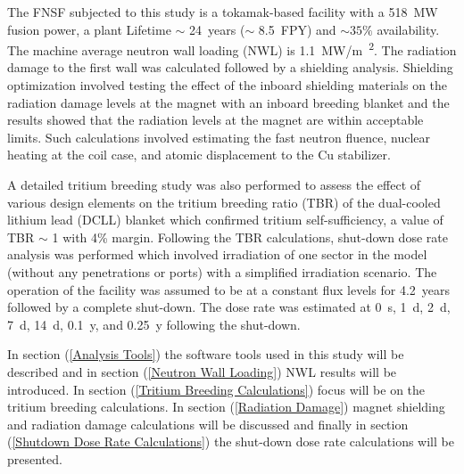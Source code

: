 \documentclass[12pt, letterpaper]{elsarticle}
\begin{document}
The FNSF subjected to this study is a tokamak-based facility with a \SI{518}{MW} fusion power, a plant Lifetime $\sim$ \SI{24}{years} ($\sim$ \SI{8.5}{FPY}) and $\sim 35\%$ availability. The machine average neutron wall loading (NWL) is \SI{1.1}{MW/m\textsuperscript{2}}. The radiation damage to the first wall was calculated followed by a shielding analysis. Shielding optimization \cite{ref_2} involved testing the effect of the inboard shielding materials on the radiation damage levels at the magnet with an inboard breeding blanket and the results showed that the radiation levels at the magnet are within acceptable limits. Such calculations involved estimating the fast neutron fluence, nuclear heating at the coil case, and atomic displacement to the Cu stabilizer.\vspace{5mm}

A detailed tritium breeding study was also performed to assess the effect of various design elements on the tritium breeding ratio (TBR) of the dual-cooled lithium lead (DCLL) blanket which confirmed tritium self-sufficiency, a value of TBR $\sim$ 1 with 4\% margin. Following the TBR calculations, shut-down dose rate analysis was performed which involved irradiation of one sector in the model (without any penetrations or ports) with a simplified irradiation scenario. The operation of the facility was assumed to be at a constant flux levels for \SI{4.2}{years} followed by a complete shut-down. The dose rate was estimated at \SI{0}{s}, \SI{1}{d}, \SI{2}{d}, \SI{7}{d}, \SI{14}{d}, \SI{0.1}{y}, and \SI{0.25}{y} following the shut-down.\vspace{5mm}

In section (\ref{Analysis Tools}) the software tools used in this study will be described and in section (\ref{Neutron Wall Loading}) NWL results will be introduced. In section (\ref{Tritium Breeding Calculations}) focus will be on the tritium breeding calculations. In section (\ref{Radiation Damage}) magnet shielding and radiation damage calculations will be discussed and finally in section (\ref{Shutdown Dose Rate Calculations}) the shut-down dose rate calculations will be presented.
\end{document}
